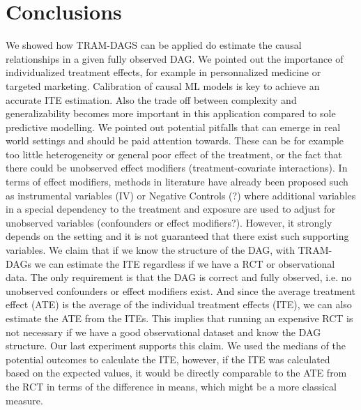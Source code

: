 

\chapter{Conclusions}


We showed how TRAM-DAGS can be applied do estimate the causal relationships in a given fully observed DAG. We pointed out the importance of individualized treatment effects, for example in personnalized medicine or targeted marketing. Calibration of causal ML models is key to achieve an accurate ITE estimation. Also the trade off between complexity and generalizability becomes more important in this application compared to sole predictive modelling. We pointed out potential pitfalls that can emerge in real world settings and should be paid attention towards. These can be for example too little heterogeneity or general poor effect of the treatment, or the fact that there could be unobserved effect modifiers (treatment-covariate interactions). In terms of effect modifiers, methods in literature have already been proposed such as instrumental variables (IV) or Negative Controls (?) where additional variables in a special dependency to the treatment and exposure are used to adjust for unobserved variables (confounders or effect modifiers?). However, it strongly depends on the setting and it is not guaranteed that there exist such supporting variables. We claim that if we know the structure of the DAG, with TRAM-DAGs we can estimate the ITE regardless if we have a RCT or observational data. The only requirement is that the DAG is correct and fully observed, i.e. no unobserved confounders or effect modifiers exist. And since the average treatment effect (ATE) is the average of the individual treatment effects (ITE), we can also estimate the ATE from the ITEs. This implies that running an expensive RCT is not necessary if we have a good observational dataset and know the DAG structure. Our last experiment supports this claim. We used the medians of the potential outcomes to calculate the ITE, however, if the ITE was calculated based on the expected values, it would be directly comparable to the ATE from the RCT in terms of the difference in means, which might be a more classical measure. 
